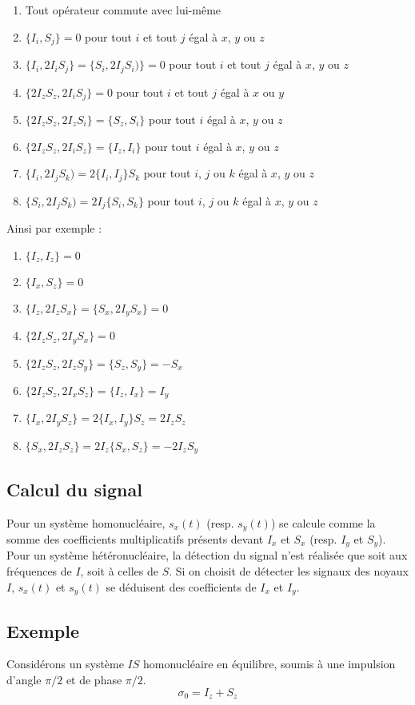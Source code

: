 \begin{enumerate}
\item Tout opérateur commute avec lui-même
\item $\{I_i,S_j\} = 0$ pour tout $i$ et tout $j$ égal à $x$, $y$ ou $z$
\item $\{I_i,2I_iS_j\} = \{S_i,2I_jS_i)\} = 0$ pour tout $i$ et tout $j$ égal à $x$, $y$ ou $z$
\item $\{2I_zS_z,2I_iS_j\} = 0$ pour tout $i$ et tout $j$ égal à $x$ ou $y$
\item $\{2I_zS_z,2I_zS_i\} = \{S_z,S_i\}$ pour tout $i$ égal à $x$, $y$ ou $z$
\item $\{2I_zS_z,2I_iS_z\} = \{I_z,I_i\}$ pour tout $i$ égal à $x$, $y$ ou $z$
\item $\{I_i,2I_jS_k) = 2\{I_i,I_j\}S_k$ pour tout $i$, $j$ ou $k$ égal à $x$, $y$ ou $z$
\item $\{S_i,2I_jS_k) = 2I_j\{S_i,S_k\}$ pour tout $i$, $j$ ou $k$ égal à $x$, $y$ ou $z$
\end{enumerate}

Ainsi par exemple :
\begin{enumerate}
\item $\{I_z,I_z\} = 0$
\item $\{I_x,S_z\} = 0$
\item $\{I_z,2I_zS_x\} = \{S_x,2I_yS_x\} = 0$
\item $\{2I_zS_z,2I_yS_x\} = 0$
\item $\{2I_zS_z,2I_zS_y\} = \{S_z,S_y\} = -S_x$
\item $\{2I_zS_z,2I_xS_z\} = \{I_z,I_x\} = I_y$
\item $\{I_x,2I_yS_z\} = 2\{I_x,I_y\}S_z = 2I_zS_z$
\item $\{S_x,2I_zS_z\} = 2I_z\{S_x,S_z\} = -2I_zS_y$
\end{enumerate}

\subsection{Calcul du signal}
Pour un système homonucléaire, $s_x(t)$ (resp. $s_y(t)$) 
se calcule comme la somme des 
coefficients multiplicatifs présents devant $I_x$ et $S_x$ 
(resp. $I_y$ et $S_y$). 
Pour un système hétéronucléaire, la détection du signal n'est réalisée 
que soit aux fréquences de $I$, 
soit à celles de $S$. 
Si on choisit de détecter les signaux des noyaux $I$, $s_x(t)$ et $s_y(t)$ 
se déduisent des coefficients de $I_x$ et $I_y$.

\subsection{Exemple}
Considérons un système $IS$ homonucléaire en équilibre, soumis à une impulsion d'angle 
$\pi/2$ et de phase $\pi/2$.
\begin{equation}
\sigma_0 = I_z + S_z
\end{equation}

